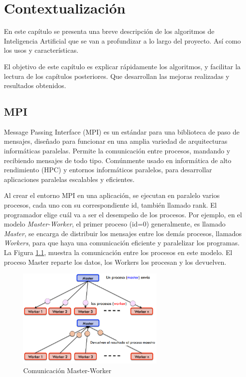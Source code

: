 \chapter{Contextualización}
\label{cap:c2_context}



	En este capítulo se presenta una breve descripción de los algoritmos de Inteligencia Artificial que se van a profundizar a lo largo del proyecto. Así como los usos y características. 
	
	El objetivo de este capítulo es explicar rápidamente los algoritmos, y facilitar la lectura de los capítulos posteriores. Que desarrollan las mejoras realizadas y resultados obtenidos.



\section{MPI}

	Message Passing Interface\cite{barker2015message}  (MPI)  es un estándar para una biblioteca de paso de mensajes, diseñado para funcionar en una amplia variedad de arquitecturas informáticas paralelas. Permite la comunicación entre procesos, mandando y recibiendo mensajes de todo tipo. Comúnmente usado en informática de alto rendimiento\cite{stone1990high} (HPC) y entornos informáticos paralelos, para desarrollar aplicaciones paralelas escalables y eficientes.
	
	
	Al crear el entorno MPI en una aplicación, se ejecutan en paralelo varios procesos, cada uno con su correspondiente id, también llamado rank. El programador elige cuál va a ser el desempeño de los procesos. Por ejemplo, en el modelo \textit{Master-Worker}, el primer proceso (id=0) generalmente, es llamado \textit{Master}, se encarga de distribuir los mensajes entre los demás procesos, llamados \textit{Workers}, para que haya una comunicación eficiente y paralelizar los programas. La Figura \ref{fig:comunicacion_mw}, muestra la comunicación entre los procesos en este modelo. El proceso Master reparte los datos, los Workers los procesan y los devuelven.


	\begin{figure}[!h]
		\centering
		\includegraphics[width=0.65\textwidth]{images/chapter_2/mpi_1}
		\caption{Comunicación Master-Worker}
		\label{fig:comunicacion_mw}
	\end{figure}

